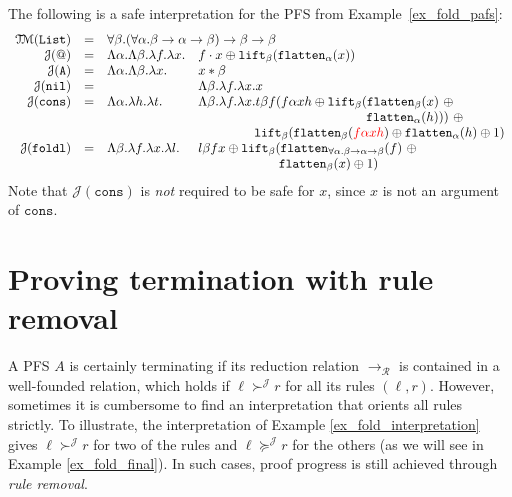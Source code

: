 \documentclass[a4paper,UKenglish,cleveref,autoref,numberwithinsect]{lipics-v2019}
\theoremstyle{definition}
\newcommand{\Rules}{\mathcal{R}}
\newcommand{\arrtype}{\rightarrow}
\newcommand{\quant}[2]{\forall #1.#2}
\newcommand{\abs}[2]{\lambda #1.#2}
\newcommand{\arr}[1]{\longrightarrow_{#1}}
\newcommand{\flatten}{\mathtt{flatten}}
\newcommand{\lift}{\mathtt{lift}}
\newcommand{\Typemap}{\mathcal{T\!M}}
\newcommand{\Termmap}{\mathcal{J}}
\newcommand{\succinterpret}{\succ^{\Termmap}}
\newcommand{\succeqinterpret}{\succeq^{\Termmap}}
\newcommand{\List}{\mathtt{List}}
\newcommand{\LCchange}[1]{\textcolor{red}{#1}}
\begin{document}
\begin{example}\label{ex_fold_interpretation}
  The following is a safe interpretation for the PFS from
  Example~\ref{ex_fold_pafs}:
  \[
  \begin{array}{rcll}
    \Typemap(\List) & = & \multicolumn{2}{l}{
      \quant{\beta}{(\quant{\alpha}{\beta \arrtype
      \alpha \arrtype \beta}) \arrtype \beta \arrtype \beta}}\\
  \Termmap(\mathtt{@}) & = & \Lambda \alpha.\Lambda\beta.
    \lambda f.\lambda x. &
    f \cdot x \oplus \lift_\beta(\flatten_\alpha(x)) \\
  \Termmap(\mathtt{A}) & = & \Lambda \alpha.\Lambda \beta.\lambda x. &
    x * \beta \\
  \Termmap(\mathtt{nil}) & = & & \Lambda \beta.\lambda f.\abs{x}{x} \\
  \Termmap(\mathtt{cons}) & = & \Lambda \alpha.\lambda h.\lambda t. &
    \Lambda \beta.\lambda f.\lambda x.
    t \beta f (f \alpha x h \oplus \lift_\beta(\flatten_\beta(x)\ 
    \oplus \\
    & & & \phantom{ABCDEFGHIJKLMNOP,} \flatten_\alpha(h)))\ \oplus\  \\
    & & & \phantom{ABCDE\ }
    \lift_\beta(\flatten_\beta(\LCchange{f\alpha x h}) \oplus
    \flatten_\alpha(h) \oplus 1) \\
  \Termmap(\mathtt{foldl}) & = & \Lambda \beta.\lambda f. \lambda x.
    \lambda l. & l \beta f x \oplus \lift_\beta(\flatten_{\forall \alpha.
    \beta \arrtype \alpha \arrtype \beta}(f)\ \oplus \\
    & & & \phantom{ABCDEFG\ \ }
    \flatten_\beta(x) \oplus 1) \\
  \end{array}
  \]
Note that $\Termmap(\mathtt{cons})$ is \emph{not} required to be safe
for $x$, since $x$ is not an argument of $\mathtt{cons}$.
\end{example}

\section{Proving termination with rule removal}\label{sec_rule_removal}

A PFS $A$ is certainly terminating if its reduction relation
$\arr{\Rules}$ is contained in a well-founded relation, which holds if
$\ell \succinterpret r$ for all its rules $(\ell,r)$.  However,
sometimes it is cumbersome to find an interpretation that orients all
rules strictly. To illustrate, the interpretation of Example
\ref{ex_fold_interpretation} gives $\ell \succinterpret r$ for two of
the rules and $\ell \succeqinterpret r$ for the others (as we will see
in Example \ref{ex_fold_final}). In such cases, proof progress is still
achieved through \emph{rule removal}.
\end{document}
